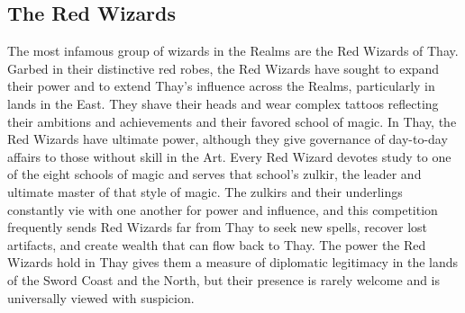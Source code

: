 \documentclass[10pt,a4paper,twoside,twocolumn,openany,bg=print,nodeprecatedcode]{dndbook}
\begin{document}
\subsection{The Red Wizards}
The most infamous group of wizards in the Realms are the Red Wizards of Thay. Garbed in their distinctive red robes, the Red Wizards have sought to expand their power and to extend Thay's influence across the Realms, particularly in lands in the East. They shave their heads and wear complex tattoos reflecting their ambitions and achievements and their favored school of magic.
In Thay, the Red Wizards have ultimate power, although they give governance of day-to-day affairs to those without skill in the Art. Every Red Wizard devotes study to one of the eight schools of magic and serves that school's zulkir, the leader and ultimate master of that style of magic. The zulkirs and their underlings constantly vie with one another for power and influence, and this competition frequently sends Red Wizards far from Thay to seek new spells, recover lost artifacts, and create wealth that can flow back to Thay. The power the Red Wizards hold in Thay gives them a measure of diplomatic legitimacy in the lands of the Sword Coast and the North, but their presence is rarely welcome and is universally viewed with suspicion.
\end{document}
